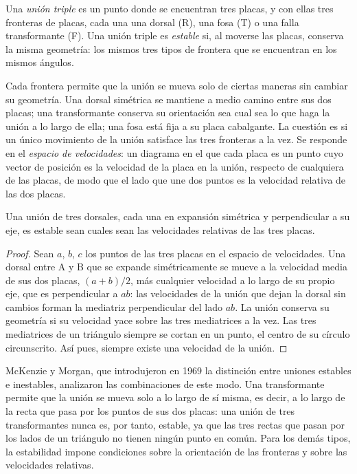 \begin{definition}\label{def:b1:plate-kinematics:triple-junction}
Una \emph{unión triple} es un punto donde se encuentran tres placas, y con ellas tres fronteras de placas, cada una
una dorsal (R), una fosa (T) o una falla transformante (F). Una unión triple es \emph{estable} si, al moverse las placas, conserva la misma geometría: los mismos tres tipos de frontera que se encuentran en los mismos ángulos.
\end{definition}

Cada frontera permite que la unión se mueva solo de ciertas maneras sin cambiar su geometría. Una dorsal simétrica se mantiene a medio
camino entre sus dos placas; una transformante conserva su orientación sea cual sea lo que haga la unión a lo largo de ella; una fosa
está fija a su placa cabalgante. La cuestión es si un único movimiento de la unión satisface las tres fronteras a la vez. Se responde
en el \emph{espacio de velocidades}: un diagrama en el que cada placa es un punto cuyo vector de posición es la velocidad de la placa
en la unión, respecto de cualquiera de las placas, de modo que el lado que une dos puntos es la velocidad relativa de las dos placas.

\begin{proposition}\label{prop:b1:plate-kinematics:rrr}
Una unión de tres dorsales, cada una en expansión simétrica y perpendicular a su eje, es estable sean cuales sean las velocidades
relativas de las tres placas.
\end{proposition}

\begin{proof}
Sean $a$, $b$, $c$ los puntos de las tres placas en el espacio de velocidades. Una dorsal entre A y B que se expande simétricamente se
mueve a la velocidad media de sus dos placas, $(a + b)/2$, más cualquier velocidad a lo largo de su propio eje, que es perpendicular a
$ab$: las velocidades de la unión que dejan la dorsal sin cambios forman la mediatriz perpendicular del lado $ab$. La unión conserva su
geometría si su velocidad yace sobre las tres mediatrices a la vez. Las tres mediatrices de un triángulo siempre se cortan en un punto,
el centro de su círculo circunscrito. Así pues, siempre existe una velocidad de la unión.
\end{proof}

McKenzie y Morgan, que introdujeron en 1969 la distinción entre uniones estables e inestables, analizaron las combinaciones de este modo.
Una transformante permite que la unión se mueva solo a lo largo de sí misma, es decir, a lo largo de la recta que pasa por los puntos de
sus dos placas: una unión de tres transformantes nunca es, por tanto, estable, ya que las tres rectas que pasan por los lados de un
triángulo no tienen ningún punto en común. Para los demás tipos, la estabilidad impone condiciones sobre la orientación de las fronteras
y sobre las velocidades relativas.

